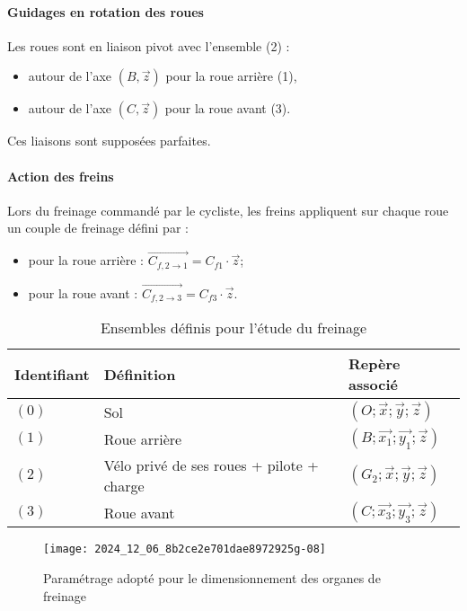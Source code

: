 \paragraph*{Guidages en rotation des roues} Les roues sont en liaison pivot avec l'ensemble (2) :

\begin{itemize}
  \item autour de l'axe \((B, \vec{z})\) pour la roue arrière (1),
  \item autour de l'axe \((C, \vec{z})\) pour la roue avant (3).
\end{itemize}

Ces liaisons sont supposées parfaites.

\paragraph*{Action des freins} Lors du freinage commandé par le cycliste, les freins appliquent sur chaque roue un couple de freinage défini par :
\begin{itemize}
\item pour la roue arrière : \(\overrightarrow{C_{f, 2 \rightarrow 1}}=C_{f 1} \cdot \vec{z}\);
\item pour la roue avant : \(\overrightarrow{C_{f, 2 \rightarrow 3}}=C_{f 3} \cdot \vec{z}\).
\end{itemize}


\begin{table}[!h]
\centering
\begin{tabular}{lll}
\hline
\textbf{Identifiant} & \textbf{Définition} & \textbf{Repère associé} \\
\hline
\((0)\) & Sol & \((O ; \vec{x} ; \vec{y} ; \vec{z})\) \\
\((1)\) & Roue arrière & \(\left(B ; \overrightarrow{x_{1}} ; \overrightarrow{y_{1}} ; \vec{z}\right)\) \\
\((2)\) & Vélo privé de ses roues + pilote + charge & \(\left(G_{2} ; \vec{x} ; \vec{y} ; \vec{z}\right)\) \\
\((3)\) & Roue avant & \(\left(C ; \overrightarrow{x_{3}} ; \overrightarrow{y_{3}} ; \vec{z}\right)\) \\
\hline
\end{tabular}
\caption{Ensembles définis pour l'étude du freinage \label{tab_31}}
\end{table}




\begin{figure}[!htb]
\begin{center}
\texttt{[image: 2024\_12\_06\_8b2ce2e701dae8972925g-08]}
\caption{Paramétrage adopté pour le dimensionnement des organes de freinage \label{fig_32}}
\end{center}
\end{figure}


